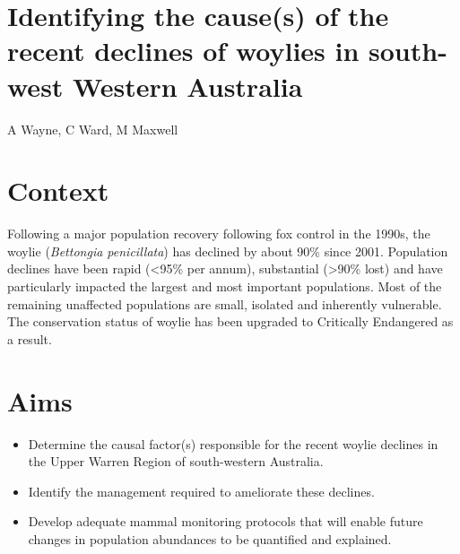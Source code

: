 \documentclass[version=last,
    paper=a4, %
    10pt, %
    usenames,
    dvipsnames,
    oneside, %
    headings=openany, %
    DIV=15 %
]{scrbook}
\begin{document}
\section*{Identifying the cause(s) of the recent declines of woylies in south-west
Western Australia
}

A Wayne, C Ward, M Maxwell


\section*{Context}
Following a major population recovery following fox control in the
1990s, the woylie (\emph{Bettongia penicillata}) has declined by about
90\% since 2001. Population declines have been rapid (\textless{}95\%
per annum), substantial (\textgreater{}90\% lost) and have particularly
impacted the largest and most important populations. Most of the
remaining unaffected populations are small, isolated and inherently
vulnerable. The conservation status of woylie has been upgraded to
Critically Endangered as a result.



\section*{Aims}
\begin{itemize}
\itemsep1pt\parskip0pt
\item
  Determine the causal factor(s) responsible for the recent woylie
  declines in the Upper Warren Region of south-western Australia.
\item
  Identify the management required to ameliorate these declines.
\item
  Develop adequate mammal monitoring protocols that will enable future
  changes in population abundances to be quantified and explained.
\end{itemize}
\end{document}
